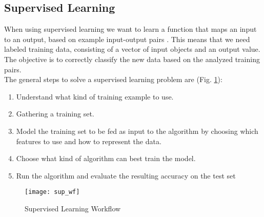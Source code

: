\subsection{Supervised Learning} \label{supervised}
When using supervised learning we want to learn a function that maps an input to an output, based on example input-output pairs \cite{ai_sup}. This means that we need labeled training data, consisting of a vector of input objects and an output value. The objective is to correctly classify the new data based on the analyzed training pairs. \\
The general steps to solve a supervised learning problem are (Fig. \ref{fig:sup_wf}):
\begin{enumerate}[noitemsep]
	\item Understand what kind of training example to use.
	\item Gathering a training set.
	\item Model the training set to be fed as input to the algorithm by choosing which features to use and how to represent the data.
	\item Choose what kind of algorithm can best train the model.
	\item Run the algorithm and evaluate the resulting accuracy on the test set 
\end{enumerate}

\begin{figure}[H]
	\centering
	\texttt{[image: sup\_wf]}
	\caption{Supervised Learning Workflow \cite{sup_wf}}
	\label{fig:sup_wf}
\end{figure}

